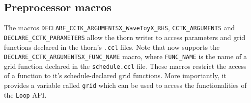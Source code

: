 \subsection{Preprocessor macros}


The macros \texttt{DECLARE\_CCTK\_ARGUMENTSX\_WaveToyX\_RHS}, \texttt{CCTK\_ARGUMENTS} and \texttt{DECLARE\_CCTK\_PARAMETERS} allow the thorn writer to access parameters and grid functions declared in the thorn's \texttt{.ccl} files. Note that \Cactus\space now supports the \texttt{DECLARE\_CCTK\_ARGUMENTSX\_FUNC\_NAME} macro, where \texttt{FUNC\_NAME} is the name of a grid function declared in the \texttt{schedule.ccl} file. These macros restrict the access of a function to it's schedule-declared grid functions. More importantly, it provides a variable called \texttt{grid} which can be used to access the functionalities of the \texttt{Loop} API.